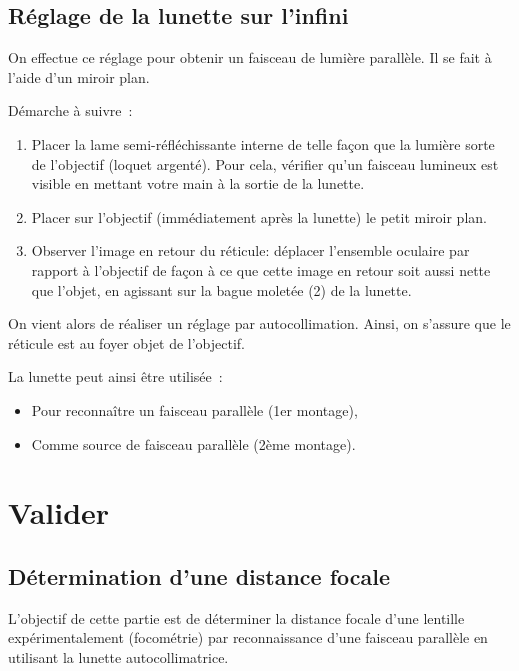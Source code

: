\documentclass[a4paper, 12pt, final, garamond]{book}
\begin{document}
\subsection{Réglage de la lunette sur l'infini}

On effectue ce réglage pour obtenir un faisceau de lumière parallèle. Il se fait
à l'aide d'un miroir plan. 

\bigskip

Démarche à suivre~:
\begin{enumerate}
    \item Placer la lame semi-réfléchissante interne de telle façon que la
        lumière sorte de l'objectif (loquet argenté). Pour cela, vérifier qu'un
        faisceau lumineux est visible en mettant votre main à la sortie de la
        lunette.
    \item Placer sur l'objectif (immédiatement après la lunette) le petit miroir
        plan.
    \item Observer l'image en retour du réticule: déplacer l'ensemble oculaire
        par rapport à l'objectif de façon à ce que cette image en retour soit
        aussi nette que l'objet, en agissant sur la bague moletée (2) de la
        lunette.
\end{enumerate}

\bigskip

On vient alors de réaliser un réglage par autocollimation. Ainsi, on s'assure
que le réticule est au foyer objet de l'objectif. 

\bigskip

La lunette peut ainsi être utilisée~:
\begin{itemize}
    \item Pour reconnaître un faisceau parallèle (1er montage),
    \item Comme source de faisceau parallèle (2ème montage).
\end{itemize}

\section{Valider}

\subsection{Détermination d'une distance focale}

L'objectif de cette partie est de déterminer la distance focale d'une lentille
expérimentalement (focométrie) par reconnaissance d'une faisceau parallèle en
utilisant la lunette autocollimatrice. 
\end{document}
